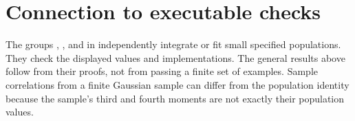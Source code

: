 \section{Connection to executable checks}

The groups ,
, and
 in
 independently
integrate or fit small specified populations. They check the displayed
values and implementations. The general results above follow from their
proofs, not from passing a finite set of examples. Sample correlations
from a finite Gaussian sample can differ from the population identity
because the sample's third and fourth moments are not exactly their
population values.
